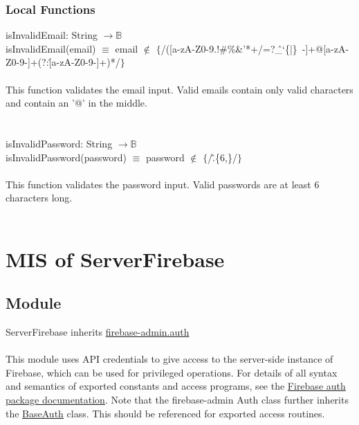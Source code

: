 \documentclass[12pt, titlepage]{article}
\begin{document}
\subsubsection{Local Functions}
isInvalidEmail: String $\rightarrow \mathbb{B}$  \\
isInvalidEmail(email) $\equiv$ email $\notin$ $\{$/([a-zA-Z0-9.!\#\%\&'*+/=?\^\_`\{|\}~-]+@[a-zA-Z0-9-]+(?:\.[a-zA-Z0-9-]+)*/$\}$ 
\\ \\
This function validates the email input. Valid emails contain only valid characters and contain an '@' in the middle. \\ 
\\
\\
isInvalidPassword: String $\rightarrow \mathbb{B}$  \\
isInvalidPassword(password) $\equiv$ password $\notin$ $\{$/\^.\{6,\}/$\}$ 
\\ \\
This function validates the password input. Valid passwords are at least 6 characters long. 
\\ \\
  
\medskip
\newpage
\section{MIS of ServerFirebase} \label{ServerFirebase} 

\subsection{Module}

ServerFirebase inherits \href{https://firebase.google.com/docs/reference/admin/node/firebase-admin.auth}{firebase-admin.auth} \\ \\
This module uses API credentials to give access to the server-side instance of Firebase, which can be used for privileged operations. For details of all syntax and semantics of exported constants and access programs, see the \href{https://firebase.google.com/docs/reference/admin/node/firebase-admin.auth}{Firebase auth package documentation}. Note that the firebase-admin Auth class further inherits the \href{https://firebase.google.com/docs/reference/admin/node/firebase-admin.auth.baseauth.md#baseauth_class}{BaseAuth} class. This should be referenced for exported access routines. 
\end{document}
